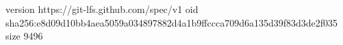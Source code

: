 version https://git-lfs.github.com/spec/v1
oid sha256:e8d09d10bb4aea5059a034897882d4a1b9ffccca709d6a135d39f83d3de2f035
size 9496
